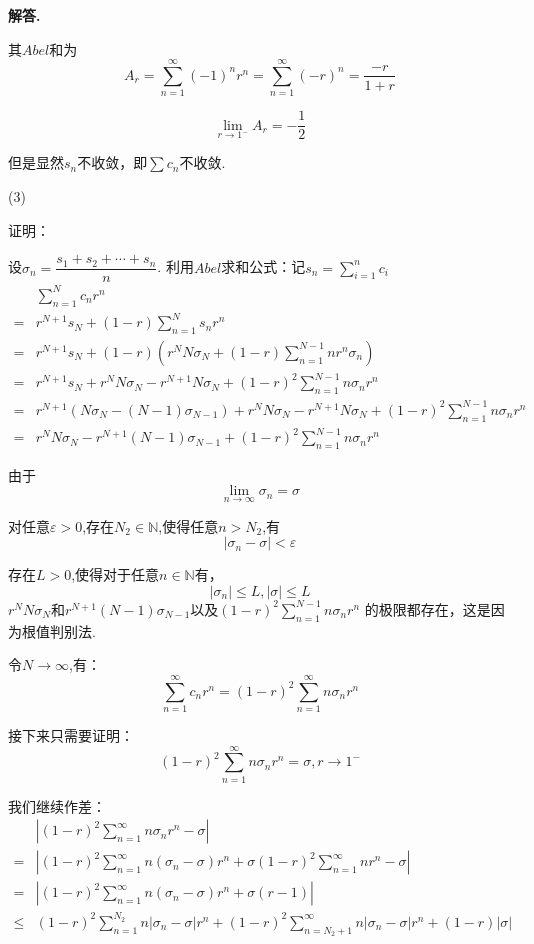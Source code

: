 \documentclass[12pt, a4paper, oneside]{ctexart}
\newenvironment{solution}{\par\noindent\textbf{解答. }}{\par}
\begin{document}
\begin{solution}
\par
其$Abel$和为
$$
A_r=\sum_{n=1}^{\infty}(-1)^nr^n=\sum_{n=1}^{\infty}(-r)^n=\dfrac{-r}{1+r}
$$
\par
$$
\lim_{r \to 1^-}A_r=-\dfrac{1}{2}
$$
\par
但是显然$s_n$不收敛，即$\sum c_n$不收敛.
\par
(3)
\par
证明：
\par
设$\sigma_n=\dfrac{s_1+s_2+\cdots+s_n}{n}$.
利用$Abel$求和公式：记$s_n=\sum_{i=1}^{n}c_i$
$$
\begin{aligned}
&\sum_{n=1}^{N}c_n r^n\\
=&r^{N+1}s_N+(1-r)\sum_{n=1}^{N}s_nr^n\\
=&r^{N+1}s_N+(1-r)\left(r^NN\sigma_N+(1-r)\sum_{n=1}^{N-1}nr^n\sigma_n\right)\\
=&r^{N+1}s_N+r^NN\sigma_N-r^{N+1}N\sigma_N+(1-r)^2\sum_{n=1}^{N-1}n\sigma_nr^n\\
=&r^{N+1}(N\sigma_N-(N-1)\sigma_{N-1})+r^NN\sigma_N-r^{N+1}N\sigma_N+(1-r)^2\sum_{n=1}^{N-1}n\sigma_nr^n\\
=&r^{N}N\sigma_N-r^{N+1}(N-1)\sigma_{N-1}+(1-r)^2\sum_{n=1}^{N-1}n\sigma_nr^n
\end{aligned}
$$
\par
由于
$$
\lim_{n \to \infty}\sigma_n=\sigma
$$
\par
对任意$\varepsilon>0$,存在$N_2\in \mathbb{N}$,使得任意$n>N_2$,有
$$
|\sigma_n-\sigma|<\varepsilon
$$
\par
存在$L>0$,使得对于任意$n\in \mathbb{N}$有，
$$
|\sigma_n|\leqslant L, |\sigma|\leqslant L
$$
$r^{N}N\sigma_N$和$r^{N+1}(N-1)\sigma_{N-1}$以及$(1-r)^2\sum_{n=1}^{N-1}n\sigma_nr^n$
的极限都存在，这是因为根值判别法.
\par
令$N\to \infty$,有：
$$
\sum_{n=1}^{\infty}c_nr^n=(1-r)^2\sum_{n=1}^{\infty}n\sigma_nr^n
$$
\par
接下来只需要证明：
$$
(1-r)^2\sum_{n=1}^{\infty}n\sigma_nr^n=\sigma, r \to 1^-
$$
\par
我们继续作差：
$$
\begin{aligned}
&\left|(1-r)^2\sum_{n=1}^{\infty}n\sigma_nr^n-\sigma\right|\\
=&\left|(1-r)^2\sum_{n=1}^{\infty}n(\sigma_n-\sigma)r^n+\sigma(1-r)^2\sum_{n=1}^{\infty}nr^n-\sigma\right|\\
=&\left|(1-r)^2\sum_{n=1}^{\infty}n(\sigma_n-\sigma)r^n+\sigma (r-1)\right|\\
\leqslant&(1-r)^2\sum_{n=1}^{N_2}n|\sigma_n-\sigma|r^n
+(1-r)^2\sum_{n=N_2+1}^{\infty}n|\sigma_n-\sigma|r^n+(1-r)|\sigma|\\

\end{aligned}$$
\end{solution}
\end{document}
